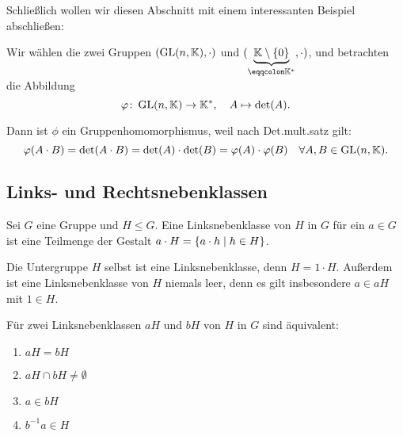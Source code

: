 {Schließlich wollen wir diesen Abschnitt mit einem interessanten Beispiel abschließen:

\begin{example}
  Wir wählen die zwei Gruppen $(\operatorname{GL}(n,\mathbb{K}),\cdot)$ und $(\underbrace{\KK\setminus\{0\}}_{\eqqcolon \KK^\ast},\cdot)$, und betrachten die Abbildung
  \[\phi \colon \GL(n,\KK) \rightarrow \KK^\ast, \quad A \mapsto \det(A).\]

  Dann ist $\phi$ ein Gruppenhomomorphismus, weil nach Det.mult.satz gilt:
  \[\phi(A \cdot B) = \det(A \cdot B) = \det(A) \cdot \det(B) = \phi(A) \cdot \phi(B) \quad \forall A,B \in \GL(n,\KK).\]
\end{example}

\subsection{Links- und Rechtsnebenklassen}

\begin{definition}[Linksnebenklasse]
  Sei $G$ eine Gruppe und $H \leq G$. Eine Linksnebenklasse von $H$ in $G$ für ein $a \in G$ ist eine Teilmenge der Gestalt $a \cdot H = \left\{ a \cdot h \suchthat h \in H \right\}$.
\end{definition}

\begin{remark}
  Die Untergruppe $H$ selbst ist eine Linksnebenklasse, denn $H = 1 \cdot H$. Außerdem ist eine Linksnebenklasse von $H$ niemals leer, denn es gilt insbesondere $a \in aH$ mit $1 \in H$.
\end{remark}

\begin{lemma}[Linksnebenklassen]
  Für zwei Linksnebenklassen $aH$ und $bH$ von $H$ in $G$ sind äquivalent:
  \begin{enumerate}[label=\alph*)]
    \item $aH = bH$
    \item $aH \cap bH \neq \emptyset$
    \item $a \in bH$
    \item $b^{-1}a \in H$
  \end{enumerate}
\end{lemma}

}
